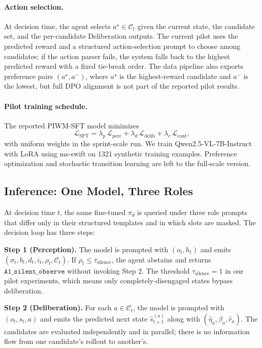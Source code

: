 \documentclass{article}
\begin{document}
\paragraph{Action selection.}
At decision time, the agent selects $a^\star \in \mathcal{C}_t$ given the current state, the candidate set, and the per-candidate Deliberation outputs. The current pilot uses the predicted reward and a structured action-selection prompt to choose among candidates; if the action parser fails, the system falls back to the highest predicted reward with a fixed tie-break order. The data pipeline also exports preference pairs $(a^\star, a^-)$, where $a^\star$ is the highest-reward candidate and $a^-$ is the lowest, but full DPO alignment is not part of the reported pilot results.

\paragraph{Pilot training schedule.}
The reported PIWM-SFT model minimizes
\[
\mathcal{L}_\text{SFT}
= \lambda_p\, \mathcal{L}_\text{perc}
+ \lambda_d\, \mathcal{L}_\text{delib}
+ \lambda_c\, \mathcal{L}_\text{cont},
\]
with uniform weights in the sprint-scale run. We train Qwen2.5-VL-7B-Instruct with LoRA using ms-swift on 1321 synthetic training examples. Preference optimization and stochastic transition learning are left to the full-scale version.

\subsection{Inference: One Model, Three Roles}
\label{sec:method:inference}

At decision time $t$, the same fine-tuned $\pi_\theta$ is queried under three role prompts that differ only in their structured templates and in which slots are masked. The decision loop has three steps:

\textbf{Step 1 (Perception).}
The model is prompted with $(o_t, h_t)$ and emits $(\sigma_t, b_t, d_t, i_t, \rho_t, \mathcal{C}_t)$. If $\rho_t \le \tau_\text{silence}$, the agent abstains and returns $\texttt{A1\_silent\_observe}$ without invoking Step 2. The threshold $\tau_\text{silence} = 1$ in our pilot experiments, which means only completely-disengaged states bypass deliberation.

\textbf{Step 2 (Deliberation).}
For each $a \in \mathcal{C}_t$, the model is prompted with $(o_t, s_t, a)$ and emits the predicted next state $\hat{s}_{t+1}^{(a)}$ along with $(\hat{\eta}_a, \hat{\beta}_a, \hat{r}_a)$. The candidates are evaluated independently and in parallel; there is no information flow from one candidate's rollout to another's.
\end{document}
